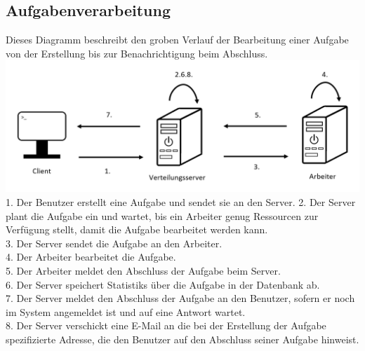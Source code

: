 \documentclass[a4paper,12pt]{article}
\begin{document}
\subsection{Aufgabenverarbeitung}
Dieses Diagramm beschreibt den groben Verlauf der Bearbeitung einer \gls{Aufgabe} von der Erstellung bis zur Benachrichtigung beim Abschluss.\\
\includegraphics[width=\linewidth]{Systemmodelle/Models/Scheduling.PNG}
\\
1. Der \gls{Benutzer} erstellt eine \gls{Aufgabe} und sendet sie an den \gls{Server}.
2. Der \gls{Server} plant die \gls{Aufgabe} ein und wartet, bis ein \gls{Arbeiter} genug Ressourcen zur Verfügung stellt, damit die \gls{Aufgabe} bearbeitet werden kann.\\
3. Der \gls{Server} sendet die \gls{Aufgabe} an den \gls{Arbeiter}.\\
4. Der \gls{Arbeiter} bearbeitet die \gls{Aufgabe}.\\
5. Der \gls{Arbeiter} meldet den Abschluss der \gls{Aufgabe} beim \gls{Server}.\\
6. Der \gls{Server} speichert \glspl{Statistik} über die \gls{Aufgabe} in der \gls{Datenbank} ab.\\
7. Der \gls{Server} meldet den Abschluss der \gls{Aufgabe} an den \gls{Benutzer}, sofern er noch im System angemeldet ist und auf eine Antwort wartet.\\
8. Der \gls{Server} verschickt eine E-Mail an die bei der Erstellung der \gls{Aufgabe} spezifizierte Adresse, die den \gls{Benutzer} auf den Abschluss seiner \gls{Aufgabe} hinweist.
\end{document}
